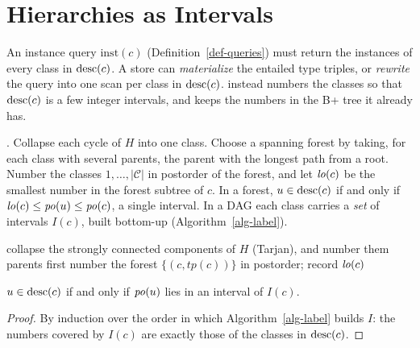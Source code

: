 \section{Hierarchies as Intervals}
\label{sec-labels}

An instance query $\mathrm{inst}(c)$ (Definition~\ref{def-queries}) must return
the instances of every class in $\mathrm{desc}(c)$.
A store can \emph{materialize} the entailed type triples, or \emph{rewrite}
the query into one scan per class in $\mathrm{desc}(c)$.
\sys instead numbers the classes so that $\mathrm{desc}(c)$ is a few integer
intervals, and keeps the numbers in the B+ tree it already has.

.
Collapse each cycle of $H$ into one class.
Choose a spanning forest by taking, for each class with several parents, the
parent with the longest path from a root.
Number the classes $1,\dots,|\mathcal{C}|$ in postorder of the forest, and let
$\mathit{lo}(c)$ be the smallest number in the forest subtree of $c$.
In a forest, $u\in\mathrm{desc}(c)$ if and only if $\mathit{lo}(c)\le\mathit{po}(u)\le\mathit{po}(c)$, a
single interval.
In a DAG each class carries a \emph{set} of intervals $I(c)$, built bottom-up
(Algorithm~\ref{alg-label}).

\begin{algorithm}[t]
\caption{Interval sets for a class DAG}\label{alg-label}
\small
{}
collapse the strongly connected components of $H$ (Tarjan), and number them parents first\;
number the forest $\{(c,\mathit{tp}(c))\}$ in postorder; record $\mathit{lo}(c)$\;
\end{algorithm}

\begin{lemma}[Correctness]\label{lem-correct}
$u\in\mathrm{desc}(c)$ if and only if $\mathit{po}(u)$ lies in an interval of $I(c)$.
\end{lemma}
\iffull
\begin{proof}
By induction over the order in which Algorithm~\ref{alg-label} builds $I$: the
numbers covered by $I(c)$ are exactly those of the classes in $\mathrm{desc}(c)$.
\end{proof}
\fi

